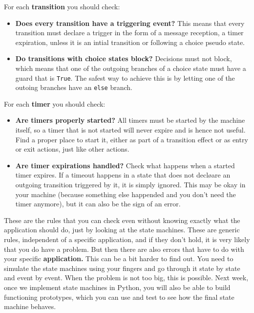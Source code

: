 \documentclass[10pt, twoside, twocolumn]{book}
\providecommand{\tightlist}{%
  \setlength{\itemsep}{0pt}\setlength{\parskip}{0pt}}
\begin{document}
For each \textbf{transition} you should check:

\begin{itemize}
\tightlist
\item
  \textbf{Does every transition have a triggering event?} This means
  that every transition must declare a trigger in the form of a message
  reception, a timer expiration, unless it is an intial transition or
  following a choice pseudo state.
\item
  \textbf{Do transitions with choice states block?} Decisions must not
  block, which means that one of the outgoing branches of a choice state
  must have a guard that is \texttt{True}. The safest way to achieve
  this is by letting one of the outoing branches have an \texttt{else}
  branch.
\end{itemize}

For each \textbf{timer} you should check:

\begin{itemize}
\tightlist
\item
  \textbf{Are timers properly started?} All timers must be started by
  the machine itself, so a timer that is not started will never expire
  and is hence not useful. Find a proper place to start it, either as
  part of a transition effect or as entry or exit actions, just like
  other actions.
\item
  \textbf{Are timer expirations handled?} Check what happens when a
  started timer expires. If a timeout happens in a state that does not
  decløare an outgoing transition triggered by it, it is simply ignored.
  This may be okay in your machine (because something else happended and
  you don't need the timer anymore), but it can also be the sign of an
  error.
\end{itemize}

These are the rules that you can check even without knowing exactly what
the application should do, just by looking at the state machines. These
are generic rules, independent of a specific application, and if they
don't hold, it is very likely that you do have a problem. But then there
are also errors that have to do with your specific \textbf{application.}
This can be a bit harder to find out. You need to simulate the state
machines using your fingers and go through it state by state and event
by event. When the problem is not too big, this is possible. Next week,
once we implement state machines in Python, you will also be able to
build functioning prototypes, which you can use and test to see how the
final state machine behaves.
\end{document}
